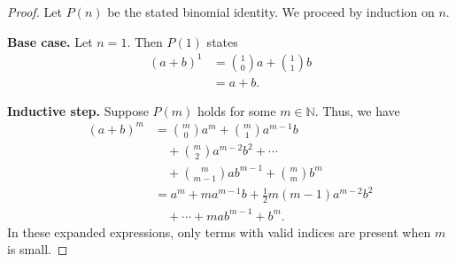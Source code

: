 \documentclass{article}
\theoremstyle{definition}
\begin{document}
\begin{proof}
Let \(P(n)\) be the stated binomial identity.
We proceed by induction on \(n\).

\textbf{Base case.} Let \(n=1\).
Then \(P(1)\) states
\begin{align*}
(a+b)^1
&=\binom{1}{0}a+\binom{1}{1}b\\
&=a+b.
\end{align*}

\textbf{Inductive step.} Suppose \(P(m)\) holds for some \(m\in\mathbb{N}\).
Thus, we have
\begin{align*}
(a+b)^m
&=\binom{m}{0}a^m+\binom{m}{1}a^{m-1}b\\
&\quad+\binom{m}{2}a^{m-2}b^2+\cdots\\
&\quad+\binom{m}{m-1}ab^{m-1}+\binom{m}{m}b^m\\
&=a^m+ma^{m-1}b+\frac12m(m-1)a^{m-2}b^2\\
&\quad+\cdots+mab^{m-1}+b^m.
\end{align*}
In these expanded expressions, only terms with valid indices are present when \(m\) is small.


\end{proof}
\end{document}
